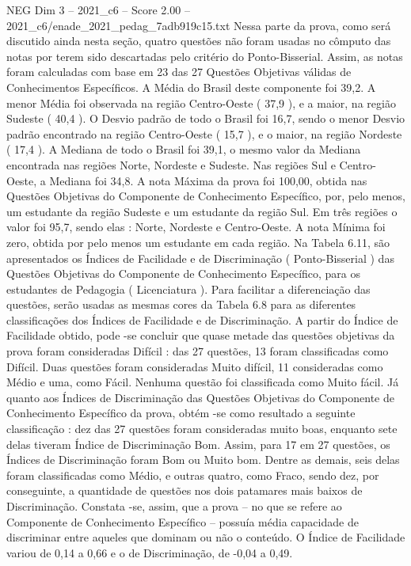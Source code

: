 \begin{textsample}{NEG Dim 3 – 2021\_c6 – Score 2.00 – 2021\_c6/enade\_2021\_pedag\_7adb919c15.txt}
Nessa parte da prova, como será discutido ainda nesta seção, quatro questões não foram usadas no cômputo das notas por terem sido descartadas pelo critério do Ponto-Bisserial.
Assim, as notas foram calculadas com base em 23 das 27 Questões Objetivas válidas de Conhecimentos Específicos.
A Média do Brasil deste componente foi 39,2.
A menor Média foi observada na região Centro-Oeste ( 37,9 ), e a maior, na região Sudeste ( 40,4 ).
O Desvio padrão de todo o Brasil foi 16,7, sendo o menor Desvio padrão encontrado na região Centro-Oeste ( 15,7 ), e o maior, na região Nordeste ( 17,4 ).
A Mediana de todo o Brasil foi 39,1, o mesmo valor da Mediana encontrada nas regiões Norte, Nordeste e Sudeste.
Nas regiões Sul e Centro-Oeste, a Mediana foi 34,8.
A nota Máxima da prova foi 100,00, obtida nas Questões Objetivas do Componente de Conhecimento Específico, por, pelo menos, um estudante da região Sudeste e um estudante da região Sul.
Em três regiões o valor foi 95,7, sendo elas : Norte, Nordeste e Centro-Oeste.
A nota Mínima foi zero, obtida por pelo menos um estudante em cada região.
Na Tabela 6.11, são apresentados os Índices de Facilidade e de Discriminação ( Ponto-Bisserial ) das Questões Objetivas do Componente de Conhecimento Específico, para os estudantes de Pedagogia ( Licenciatura ).
Para facilitar a diferenciação das questões, serão usadas as mesmas cores da Tabela 6.8 para as diferentes classificações dos Índices de Facilidade e de Discriminação.
A partir do Índice de Facilidade obtido, pode -se concluir que quase metade das questões objetivas da prova foram consideradas Difícil : das 27 questões, 13 foram classificadas como Difícil.
Duas questões foram consideradas Muito difícil, 11 consideradas como Médio e uma, como Fácil.
Nenhuma questão foi classificada como Muito fácil.
Já quanto aos Índices de Discriminação das Questões Objetivas do Componente de Conhecimento Específico da prova, obtém -se como resultado a seguinte classificação : dez das 27 questões foram consideradas muito boas, enquanto sete delas tiveram Índice de Discriminação Bom.
Assim, para 17 em 27 questões, os Índices de Discriminação foram Bom ou Muito bom.
Dentre as demais, seis delas foram classificadas como Médio, e outras quatro, como Fraco, sendo dez, por conseguinte, a quantidade de questões nos dois patamares mais baixos de Discriminação.
Constata -se, assim, que a prova – no que se refere ao Componente de Conhecimento Específico – possuía média capacidade de discriminar entre aqueles que dominam ou não o conteúdo.
O Índice de Facilidade variou de 0,14 a 0,66 e o de Discriminação, de -0,04 a 0,49.

\end{textsample}
